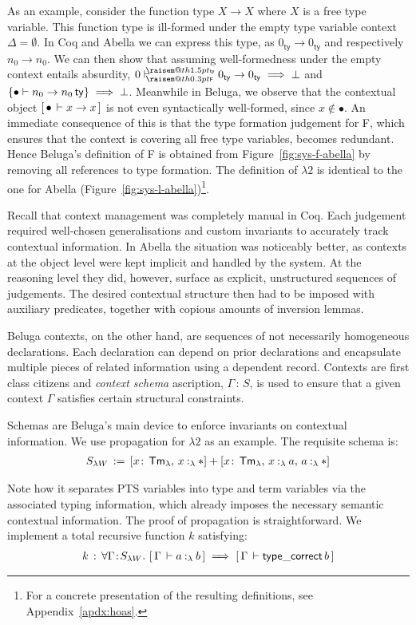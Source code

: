 \documentclass[a4paper,UKenglish]{lipics-v2016}
\makeatletter
\newcommand{\ms}{\,}
\newcommand{\mrel}[1]{\mathrel{\ms #1 \ms}}
\newcommand{\OF}{\mrel{:}}
\newcommand{\mAll}[1]{\ensuremath{\forall} #1.\ms\ms}
\newcommand{\eqdef}{\mrel{:=}}
\newcommand{\SysL}{$\lambda2$\xspace}
\newcommand{\TmL}{\ensuremath{\mathsf{Tm_{\lambda}}}}
\newcommand{\ty}{\mathsf{ty}}
\newcommand{\of}{\ensuremath{\!:\!}}
\newcommand{\raisemath}[1]{\mathpalette{\raisem@th{#1}}}
\newcommand{\raisem@th}[3]{\raisebox{#1}{\ensuremath{#2#3}}}
\newcommand{\tsAnnot}[2]{\vdash\hspace{-.7em}^{\raisemath{1.5pt}{\scriptscriptstyle{#2}}}_{\raisemath{0.3pt}{\scriptscriptstyle{#1}}}} %
\newcommand{\tfF}{\tsAnnot{\mathsf{F}}{\ty}}  %
\newcommand{\istyF}[2]{\ensuremath{{#1} \mathrel{\tfF} #2}}
\newcommand{\istyFh}[1]{\ensuremath{#1\ms\mathsf{ty}}}
\newcommand{\typingLh}[2]{\ensuremath{#1 \mathbin{:_{\lambda}} #2}}
\newcommand{\Prp}{\ensuremath{\textrm{\textasteriskcentered}}}
\newcommand{\emptyctx}{\ensuremath{\bullet}}
\theoremstyle{plain}
\makeatother
\begin{document}
As an example, consider the function type $X \to X$ where $X$ is a free type variable.
This function type is ill-formed under the empty type variable context $\Delta = \emptyset$.
In Coq and Abella we can express this type, as $0_\ty \to 0_\ty$ and respectively $n_0 \to n_0$.
We can then show that assuming well-formedness under the empty context entails absurdity, $\istyF{0}{0_\ty \to 0_\ty} \implies \bot$ and $\aj{\emptyctx}{\istyFh{n_0 \to n_0}} \implies \bot$.
Meanwhile in Beluga, we observe that the contextual object $\bc{\emptyctx}{x \to x}$ is not even syntactically well-formed, since $x \notin \emptyctx$.
An immediate consequence of this is that the type formation judgement for F, which ensures that the context is covering all free type variables, becomes redundant.
Hence Beluga's definition of F is obtained from Figure~\ref{fig:sys-f-abella} by removing all references to type formation.
The definition of \SysL is identical to the one for Abella (Figure~\ref{fig:sys-l-abella})\footnote{For a concrete presentation of the resulting definitions, see Appendix~\ref{apdx:hoas}.}.

Recall that context management was completely manual in Coq.
Each judgement required well-chosen generalisations and custom invariants to accurately track contextual information.
In Abella the situation was noticeably better, as contexts at the object level were kept implicit and handled by the system.
At the reasoning level they did, however, surface as explicit, unstructured sequences of judgements.
The desired contextual structure then had to be imposed with auxiliary predicates, together with copious amounts of inversion lemmas.

Beluga contexts, on the other hand, are sequences of not necessarily homogeneous declarations.
Each declaration can depend on prior declarations and encapsulate multiple pieces of related information using a dependent record.
Contexts are first class citizens and \emph{context schema} ascription, $\Gamma \OF S$, is used to ensure that a given context $\Gamma$ satisfies certain structural constraints.

Schemas are Beluga's main device to enforce invariants on contextual information.
We use propagation for \SysL as an example.
The requisite schema is:
\begin{align*}
  S_{\lambda W} \eqdef [x\sof\TmL \ssep \typingLh{x}{\Prp}] + [x\sof\TmL \ssep \typingLh{x}{a} \ssep \typingLh{a}{\Prp}]
\end{align*}

Note how it separates PTS variables into type and term variables via the associated typing information, which already imposes the necessary semantic contextual information.
The proof of propagation is straightforward.
We implement a total recursive function $k$ satisfying:
\begin{align*}
  k \OF \mAll{\Gamma \of S_{\lambda W}} \bc{\Gamma}{\typingLh{a}{b}} \implies \bc{\Gamma}{\mathsf{type\_correct}\,b}
\end{align*}
\end{document}
